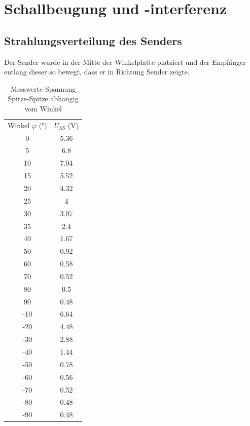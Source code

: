 \documentclass[
  headings=optiontotocandhead,
  twoside,
  openright,
  numbers=noenddot,
  toc=flat,
  11pt,
  parskip=full,
  listof=flat,
  bibliography=totoc,
  a4paper,
  DIV=14,
  BCOR=22mm,
  headheight=5mm,
  headinclude=true,
]{scrartcl}
\begin{document}
\section{Schallbeugung und -interferenz}

\subsection{Strahlungsverteilung des Senders}
\label{sec:kreis}

Der Sender wurde in der Mitte der Winkelplatte platziert und der Empfänger entlang dieser so bewegt, dass er in Richtung Sender zeigte.

\begin{table}[H]
  \centering
  \setlength{\tabcolsep}{10pt}
  \begin{tabular}{ |c|c| }
    \multicolumn{1}{c}{Winkel $\varphi$ (°)} & \multicolumn{1}{c}{$U_{SS}$ (V)} \\
    0  & 5.36 \\
    5  & 6.8 \\
    10 & 7.04 \\
    15 & 5.52 \\
    20 & 4.32 \\
    25 & 4 \\
    30 & 3.07 \\
    35 & 2.4 \\
    40 & 1.67 \\
    50 & 0.92 \\
    60 & 0.58 \\
    70 & 0.52 \\
    80 & 0.5 \\
    90 & 0.48 \\
   -10 & 6.64 \\
   -20 & 4.48 \\
   -30 & 2.88 \\
   -40 & 1.44 \\
   -50 & 0.78 \\
   -60 & 0.56 \\
   -70 & 0.52 \\
   -80 & 0.48 \\
   -90 & 0.48 \\
  \end{tabular}
  \caption{Messwerte Spannung Spitze-Spitze abhängig vom Winkel}
  \label{tab:winkel1}
\end{table}
\end{document}
